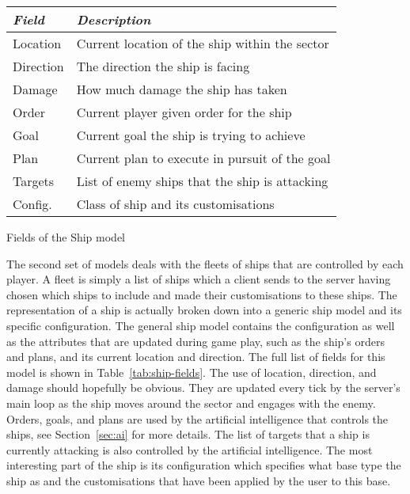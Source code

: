 \begin{margintable}
    \begin{tabular}{p{4em} p{11em}}
    \toprule
    \emph{Field} & \emph{Description} \\
    \midrule
    Location & Current location of the ship within the sector \\
    Direction & The direction the ship is facing \\
    Damage & How much damage the ship has taken \\
    Order & Current player given order for the ship \\
    Goal & Current goal the ship is trying to achieve \\
    Plan & Current plan to execute in pursuit of the goal \\
    Targets & List of enemy ships that the ship is attacking \\
    Config. & Class of ship and its customisations \\
    \bottomrule
    \end{tabular}
    \vspace{1em}
    \caption{Fields of the Ship model}
    \label{tab:ship-fields}
\end{margintable}

The second set of models deals with the fleets of ships that are controlled by each player. A fleet is simply a list of ships which a client sends to the server having chosen which ships to include and made their customisations to these ships. The representation of a ship is actually broken down into a generic ship model and its specific configuration. The general ship model contains the configuration as well as the attributes that are updated during game play, such as the ship's orders and plans, and its current location and direction. The full list of fields for this model is shown in Table~\ref{tab:ship-fields}. The use of location, direction, and damage should hopefully be obvious. They are updated every tick by the server's main loop as the ship moves around the sector and engages with the enemy. Orders, goals, and plans are used by the artificial intelligence that controls the ships, see Section~\ref{sec:ai} for more details. The list of targets that a ship is currently attacking is also controlled by the artificial intelligence. The most interesting part of the ship is its configuration which specifies what base type the ship as and the customisations that have been applied by the user to this base.

